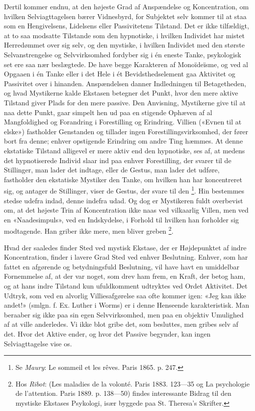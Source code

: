 \documentclass[12pt,a4paper,openany]{book}
\newcommand{\opage}[1]{\marginnote{\footnotesize\textit{[#1]}}}
\begin{document}
Dertil kommer endnu, at den højeste Grad af Anspændelse og Koncentration, om
hvilken Selviagttagelsen bærer Vidnesbyrd, for Subjektet selv kommer til at
staa som en Hengivelsens, Lidelsens eller Passivitetens Tilstand. Det er ikke
tilfældigt, at to saa modsatte Tilstande som den hypnotiske, i hvilken
Individet har mistet Herredømmet over sig selv, og den mystiske, i hvilken
Individet med den største Selvanstrengelse og Selvvirksomhed fordyber sig i én
eneste Tanke, psykologisk set ere saa nær beslægtede. De have begge Karakteren
af Monoïdeïsme, og ved al Opgaaen i én Tanke eller i det Hele i ét
Bevidsthedselement gaa Aktivitet og Passivitet over i hinanden. Anspændelsen
danner Indledningen til Betagetheden, og hvad Mystikerne kalde Ekstasen
betegner det Punkt, hvor den mere aktive Tilstand giver Plads for den mere
passive. Den Anvisning, Mystikerne give til at naa dette Punkt, gaar simpelt
hen ud paa en stigende Ophæven af al Mangfoldighed og Forandring i Forestilling
og Erindring. Villien («Evnen til at elske») fastholder Genstanden og tillader
ingen Forestillingsvirksomhed, der fører bort fra denne; enhver opstigende
Erindring om andre Ting hæmmes. At denne ekstatiske Tilstand alligevel er mere
aktiv end den hypnotiske, ses af, at medens det hypnotiserede Individ slaar ind
paa enhver Forestilling, der svarer til de Stillinger, man lader det indtage,
eller de Gestus, man lader det udføre, fastholder den ekstatiske Mystiker den
Tanke, om hvilken han har koncentreret sig, og antager de Stillinger, viser de
Gestus, der svare til den%
\footnote[2]{Se \emph{Maury}: Le sommeil et les rêves. Paris 1865. p. 247.}.
Hin bestemmes stedse udefra indad, denne indefra udad. Og dog er Mystikeren
fuldt overbevist om, at det højeste Trin af Koncentration ikke naas ved
vilkaarlig Villen, men ved en «Naadesimpuls», ved en Indskydelse, i Forhold til
hvilken han forholder sig modtagende. Han griber ikke mere, men bliver greben%
\footnote[3]{Hos \emph{Ribot}: (Les maladies de la volonté. Paris 1883.
123---35 og La psychologie de l'attention. Paris 1889. p. 138---50) findes
interessante Bidrag til den mystiske Ekstases Psykologi, især byggede paa St.
Theresa's Skrifter.}.

\setcounter{footnote}{0}%
\opage{76}Hvad der saaledes finder Sted ved mystisk Ekstase, der er
Højdepunktet af indre Koncentration, finder i lavere Grad Sted ved enhver
Beslutning. Enhver, som har fattet en afgørende og betydningsfuld Beslutning,
vil have havt en umiddelbar Fornemmelse af, at der var noget, som drev ham
frem, en Kraft, der betog ham, og at hans indre Tilstand kun ufuldkomment
udtryktes ved Ordet Aktivitet. Det Udtryk, som ved en alvorlig Villiesafgørelse
saa ofte kommer igen: «Jeg kan ikke andet!» (smlgn. f. Ex. Luther i Worms) er i
denne Henseende karakteristisk. Man beraaber sig ikke paa sin egen
Selvvirksomhed, men paa en objektiv Umulighed af at ville anderledes. Vi ikke
blot gribe det, som besluttes, men gribes selv af det. Hvor det Aktive ender,
og hvor det Passive begynder, kan ingen Selviagttagelse vise os.
\end{document}

